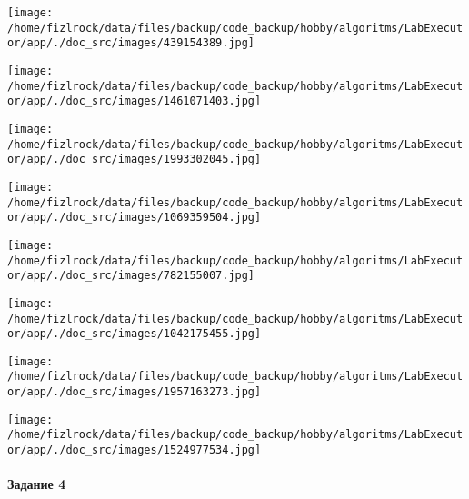 \documentclass[a4paper, 12pt]{article}
\begin{document}
\texttt{[image: /home/fizlrock/data/files/backup/code\_backup/hobby/algoritms/LabExecutor/app/./doc\_src/images/439154389.jpg]}

\texttt{[image: /home/fizlrock/data/files/backup/code\_backup/hobby/algoritms/LabExecutor/app/./doc\_src/images/1461071403.jpg]}

\texttt{[image: /home/fizlrock/data/files/backup/code\_backup/hobby/algoritms/LabExecutor/app/./doc\_src/images/1993302045.jpg]}

\texttt{[image: /home/fizlrock/data/files/backup/code\_backup/hobby/algoritms/LabExecutor/app/./doc\_src/images/1069359504.jpg]}

\texttt{[image: /home/fizlrock/data/files/backup/code\_backup/hobby/algoritms/LabExecutor/app/./doc\_src/images/782155007.jpg]}

\texttt{[image: /home/fizlrock/data/files/backup/code\_backup/hobby/algoritms/LabExecutor/app/./doc\_src/images/1042175455.jpg]}

\texttt{[image: /home/fizlrock/data/files/backup/code\_backup/hobby/algoritms/LabExecutor/app/./doc\_src/images/1957163273.jpg]}

\texttt{[image: /home/fizlrock/data/files/backup/code\_backup/hobby/algoritms/LabExecutor/app/./doc\_src/images/1524977534.jpg]}
\pagebreak
\paragraph{Задание 4}
\end{document}
